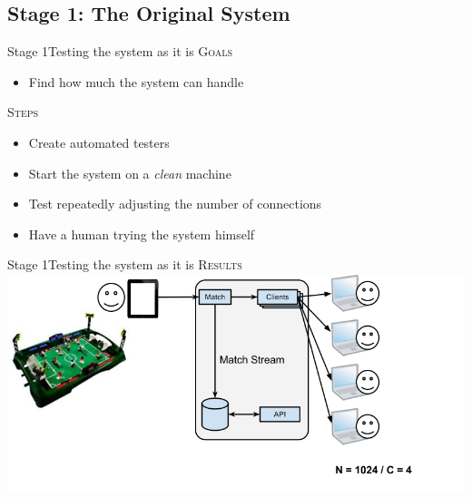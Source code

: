 \documentclass[utf8]{beamer}
\begin{document}
\subsection{Stage 1: The Original System}
\begin{frame}{Stage 1}{Testing the system as it is}
	\textsc{Goals}
	\begin{itemize}
		\item Find how much the system can handle
	\end{itemize}
	\pause
	\textsc{Steps}
	\begin{itemize}
		\item Create automated testers
		\item Start the system on a \emph{clean} machine
		\item Test repeatedly adjusting the number of connections
		\item Have a human trying the system himself
	\end{itemize}
\end{frame}
\begin{frame}{Stage 1}{Testing the system as it is}
	\textsc{Results}
	\includegraphics[top=-1,width=\textwidth]{img/MatchStream-1.png}
\end{frame}
\end{document}
